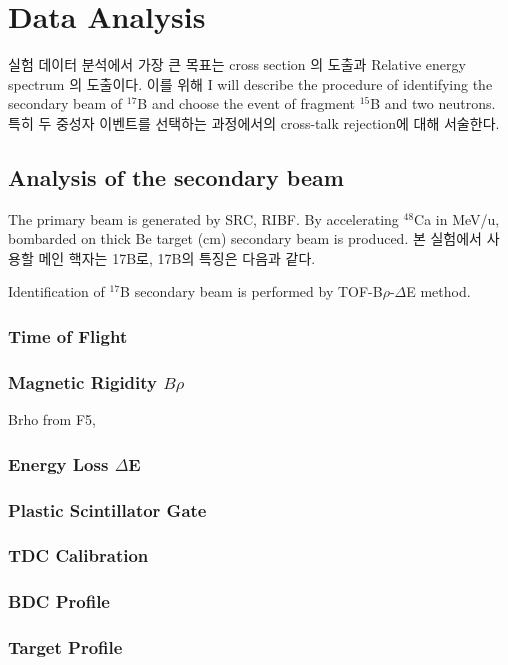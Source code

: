 \chapter{Data Analysis}
실험 데이터 분석에서 가장 큰 목표는 cross section 의 도출과 Relative energy spectrum 의 도출이다. 이를 위해 I will describe the procedure of identifying the secondary beam of ${}^{17}$B and choose the event of fragment ${}^{15}$B and two neutrons. 특히 두 중성자 이벤트를 선택하는 과정에서의 cross-talk rejection에 대해 서술한다. 

\section{Analysis of the secondary beam}
The primary beam is generated by SRC, RIBF. By accelerating ${}^{48}$Ca in  MeV/u, bombarded on thick Be target (cm) secondary beam is produced. 본 실험에서 사용할 메인 핵자는 17B로,
17B의 특징은 다음과 같다.

Identification of ${}^{17}$B secondary beam  is performed by TOF-B$\rho$-$\Delta$E method. 
\subsection{Time of Flight}

\subsection{Magnetic Rigidity $B\rho$}
Brho from F5,

\subsection{Energy Loss $\Delta$E}

\subsection{Plastic Scintillator Gate}

\subsection{TDC Calibration}
\subsection{BDC Profile}
\subsection{Target Profile}
